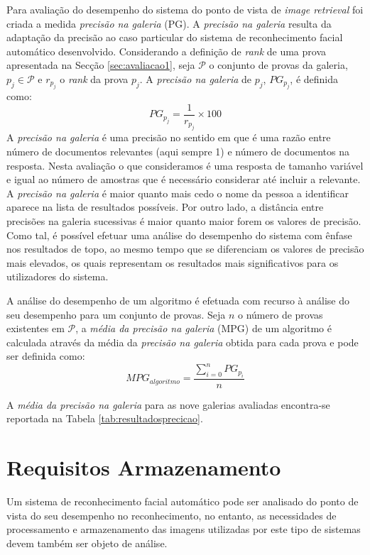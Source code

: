 \documentclass{llncs}
\begin{document}
Para avaliação do desempenho do sistema do ponto de vista de \textit{image retrieval} foi criada a medida \textit{precisão na galeria} (PG). A \textit{precisão na galeria} resulta da adaptação da precisão ao caso particular do sistema de reconhecimento facial automático desenvolvido. Considerando a definição de \textit{rank} de uma prova apresentada na Secção \ref{sec:avaliacao1}, seja $\mathscr{P}$ o conjunto de provas da galeria, $p_j \in \mathscr{P}$ e $r_{p_j}$ o \textit{rank} da prova $p_j$. A \textit{precisão na galeria} de $p_j$, $PG_{p_j}$, é definida como:
\begin{equation}
PG_{p_j} = \frac{1}{r_{p_j}} \times 100
\end{equation}
A \textit{precisão na galeria} é uma precisão no sentido em que é uma razão entre número de documentos relevantes (aqui sempre 1) e número de documentos na resposta. Nesta avaliação o que consideramos é uma resposta de tamanho variável e igual ao número de amostras que é necessário considerar até incluir a relevante. A \textit{precisão na galeria} é maior quanto mais cedo o nome da pessoa a identificar aparece na lista de resultados possíveis. Por outro lado, a distância entre precisões na galeria sucessivas é maior quanto maior forem os valores de precisão. Como tal, é possível efetuar uma análise do desempenho do sistema com ênfase nos resultados de topo, ao mesmo tempo que se diferenciam os valores de precisão mais elevados, os quais representam os resultados mais significativos para os utilizadores do sistema.

A análise do desempenho de um algoritmo é efetuada com recurso à análise do seu desempenho para um conjunto de provas. Seja $n$ o número de provas existentes em $\mathscr{P}$, a \textit{média da precisão na galeria} (MPG) de um algoritmo é calculada através da média da \textit{precisão na galeria} obtida para cada prova e pode ser definida como:
\begin{equation}
MPG_{algoritmo} = \frac{ \sum\limits_{i=0}^{n} PG_{p_i} }{n}
\end{equation}

A \textit{média da precisão na galeria} para as nove galerias avaliadas encontra-se reportada na Tabela \ref{tab:resultadosprecicao}.


\section{Requisitos Armazenamento}
Um sistema de reconhecimento facial automático pode ser analisado do ponto de vista do seu desempenho no reconhecimento, no entanto, as necessidades de processamento e armazenamento das imagens utilizadas por este tipo de sistemas devem também ser objeto de análise. 
\end{document}

